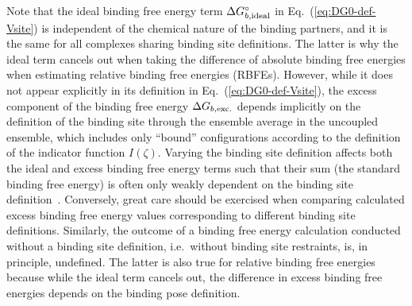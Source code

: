 \documentclass[9pt,bestpractices]{livecoms}
\begin{document}
Note that the ideal binding free energy term $\Delta G^\circ_{b,{\rm ideal}}$ in Eq.~(\ref{eq:DG0-def-Vsite}) is independent of the chemical nature of the binding partners, and it is the same for all complexes sharing binding site definitions. The latter is why the ideal term cancels out when taking the difference of absolute binding free energies when estimating relative binding free energies (RBFEs). However, while it does not appear explicitly in its definition in Eq.~(\ref{eq:DG0-def-Vsite}), the excess component of the binding free energy $\Delta G_{b,{\rm exc.}}$ depends implicitly on the definition of the binding site through the ensemble average in the uncoupled ensemble, which includes only ``bound'' configurations according to the definition of the indicator function $I(\zeta)$. Varying the binding site definition affects both the ideal and excess binding free energy terms such that their sum (the standard binding free energy) is often only weakly dependent on the binding site definition~\cite{gilson1997statisticalthermodynamic,gallicchio2011recent}. Conversely, great care should be exercised when comparing calculated excess binding free energy values corresponding to different binding site definitions. Similarly, the outcome of a binding free energy calculation conducted without a binding site definition, i.e.\ without binding site restraints, is, in principle, undefined. The latter is also true for relative binding free energies because while the ideal term cancels out, the difference in excess binding free energies depends on the binding pose definition. 
\end{document}
